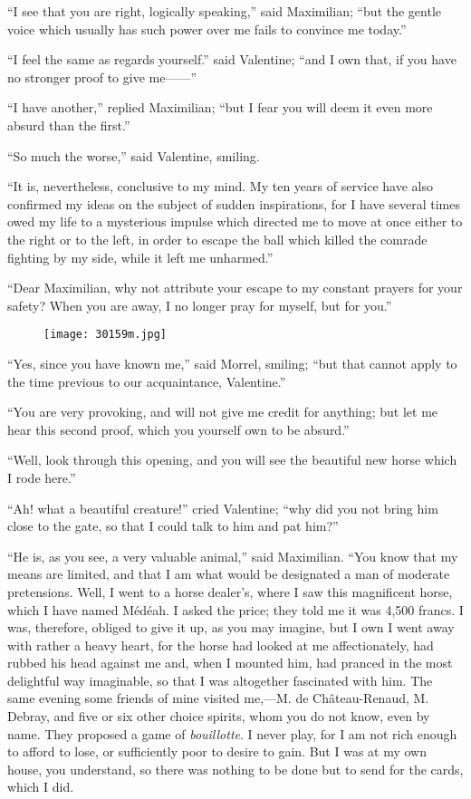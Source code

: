“I see that you are right, logically speaking,” said Maximilian; “but
the gentle voice which usually has such power over me fails to convince
me today.”

“I feel the same as regards yourself.” said Valentine; “and I own that,
if you have no stronger proof to give me——”

“I have another,” replied Maximilian; “but I fear you will deem it even
more absurd than the first.”

“So much the worse,” said Valentine, smiling.

“It is, nevertheless, conclusive to my mind. My ten years of service
have also confirmed my ideas on the subject of sudden inspirations, for
I have several times owed my life to a mysterious impulse which
directed me to move at once either to the right or to the left, in
order to escape the ball which killed the comrade fighting by my side,
while it left me unharmed.”

“Dear Maximilian, why not attribute your escape to my constant prayers
for your safety? When you are away, I no longer pray for myself, but
for you.”

\begin{figure}[ht]
\texttt{[image: 30159m.jpg]}
\end{figure}

“Yes, since you have known me,” said Morrel, smiling; “but that cannot
apply to the time previous to our acquaintance, Valentine.”

“You are very provoking, and will not give me credit for anything; but
let me hear this second proof, which you yourself own to be absurd.”

“Well, look through this opening, and you will see the beautiful new
horse which I rode here.”

“Ah! what a beautiful creature!” cried Valentine; “why did you not
bring him close to the gate, so that I could talk to him and pat him?”

“He is, as you see, a very valuable animal,” said Maximilian. “You know
that my means are limited, and that I am what would be designated a man
of moderate pretensions. Well, I went to a horse dealer’s, where I saw
this magnificent horse, which I have named Médéah. I asked the price;
they told me it was 4,500 francs. I was, therefore, obliged to give it
up, as you may imagine, but I own I went away with rather a heavy
heart, for the horse had looked at me affectionately, had rubbed his
head against me and, when I mounted him, had pranced in the most
delightful way imaginable, so that I was altogether fascinated with
him. The same evening some friends of mine visited me,—M. de
Château-Renaud, M. Debray, and five or six other choice spirits, whom
you do not know, even by name. They proposed a game of \textit{bouillotte}. I
never play, for I am not rich enough to afford to lose, or sufficiently
poor to desire to gain. But I was at my own house, you understand, so
there was nothing to be done but to send for the cards, which I did.

